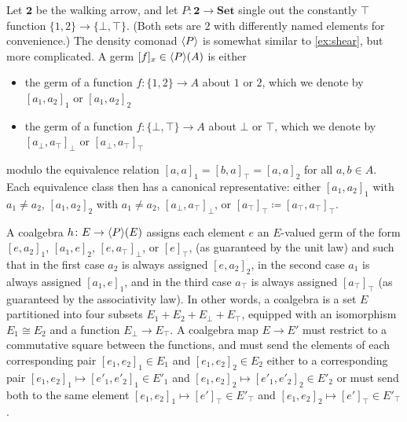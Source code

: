 \documentclass[11pt, oneside, article]{memoir}
\theoremstyle{plain}
\theoremstyle{definition}
\theoremstyle{remark}
\newenvironment{counterexample}
{\renewcommand\qedsymbol{$\lrcorner$}%
  \pushQED{\qed}\mycounterexample}
{\popQED\endmycounterexample}
\DeclarePairedDelimiter{\gen}{\langle}{\rangle}
\newcommand{\namedcat}[1]{\mathbf{#1}}
\newcommand{\Set}{\namedcat{Set}}
\newcommand{\arro}{\mathbf{2}}
\newcommand{\ph}[1]{#1}
\newcommand{\setof}[1]{\{#1\}}
\newcommand{\eE}{E}
\newcommand{\xA}{A}
\newcommand{\hH}{h}
\newcommand{\pP}{\ph{P}}
\newcommand{\cP}{\gen{\pP}}
\begin{document}
\begin{counterexample}[Basis-like non-basis II]
  Let $\arro$ be the walking arrow, and let
  $\pP \colon \arro \to \Set$ single out the constantly $\top$
  function $\setof{1, 2} \to \setof{\bot, \top}$. (Both sets are $2$
  with differently named elements for convenience.) The density
  comonad $\cP$ is somewhat similar to \cref{ex:shear}, but more
  complicated. A germ $[f]_x \in \cP(\xA)$ is either
  \begin{itemize}
  \item the germ of a function $f \colon \setof{1, 2} \to \xA$ about
    $1$ or $2$, which we denote by $[a_1, a_2]_1$ or $[a_1, a_2]_2$
  \item the germ of a function $f \colon \setof{\bot, \top} \to \xA$
    about $\bot$ or $\top$, which we denote by $[a_\bot, a_\top]_\bot$
    or $[a_\bot, a_\top]_\top$
  \end{itemize}
  modulo the equivalence relation $[a, a]_1 = [b, a]_\top = [a, a]_2$
  for all $a, b \in \xA$. Each equivalence class then has a canonical
  representative: either $[a_1, a_2]_1$ with $a_1 \neq a_2$,
  $[a_1, a_2]_2$ with $a_1 \neq a_2$, $[a_\bot, a_\top]_\bot$, or
  $[a_\top]_\top \coloneqq [a_\top, a_\top]_\top$.

  A coalgebra $\hH \colon \eE \to \cP(\eE)$ assigns each element $e$
  an $\eE$-valued germ of the form $[e, a_2]_1$, $[a_1, e]_2$,
  $[e, a_\top]_\bot$, or $[e]_\top$, (as guaranteed by the unit law)
  and such that in the first case $a_2$ is always assigned
  $[e, a_2]_2$, in the second case $a_1$ is always assigned
  $[a_1, e]_1$, and in the third case $a_\top$ is always assigned
  $[a_\top]_\top$ (as guaranteed by the associativity law). In other
  words, a coalgebra is a set $\eE$ partitioned into four subsets
  $\eE_1 + \eE_2 + \eE_\bot + \eE_\top$, equipped with an isomorphism
  $\eE_1 \cong \eE_2$ and a function $\eE_\bot \to \eE_\top$. A
  coalgebra map $\eE \to \eE'$ must restrict to a commutative square
  between the functions, and must send the elements of each
  corresponding pair $[e_1, e_2]_1 \in \eE_1$ and
  $[e_1, e_2]_2 \in \eE_2$ either to a corresponding pair
  $[e_1, e_2]_1\mapsto [e'_1, e'_2]_1 \in \eE'_1$ and
  $[e_1, e_2]_2\mapsto [e'_1, e'_2]_2\in \eE'_2$ or must send both to
  the same element $[e_1, e_2]_1\mapsto [e']_\top \in \eE'_\top$ and
  $[e_1, e_2]_2\mapsto [e']_\top\in \eE'_\top$.



\end{counterexample}
\end{document}

